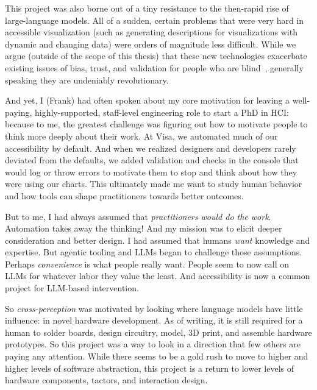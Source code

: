 \documentclass[12pt]{cmuthesis}
\begin{document}
This project was also borne out of a tiny resistance to the then-rapid rise of large-language models. All of a sudden, certain problems that were very hard in accessible visualization (such as generating descriptions for visualizations with dynamic and changing data) were orders of magnitude less difficult. While we argue (outside of the scope of this thesis) that these new technologies exacerbate existing issues of bias, trust, and validation for people who are blind~\cite{Elavsky2025}, generally speaking they are undeniably revolutionary.

And yet, I (Frank) had often spoken about my core motivation for leaving a well-paying, highly-supported, staff-level engineering role to start a PhD in HCI: because to me, the greatest challenge was figuring out how to motivate people to think more deeply about their work. At Visa, we automated much of our accessibility by default. And when we realized designers and developers rarely deviated from the defaults, we added validation and checks in the console that would log or throw errors to motivate them to stop and think about how they were using our charts. This ultimately made me want to study human behavior and how tools can shape practitioners towards better outcomes.

But to me, I had always assumed that \textit{practitioners would do the work}. Automation takes away the thinking! And my mission was to elicit deeper consideration and better design. I had assumed that humans \textit{want} knowledge and expertise. But agentic tooling and LLMs began to challenge those assumptions. Perhaps \textit{convenience} is what people really want. People seem to now call on LLMs for whatever labor they value the least. And accessibility is now a common project for LLM-based intervention.

So \textit{cross-perception} was motivated by looking where language models have little influence: in novel hardware development. As of writing, it is still required for a human to solder boards, design circuitry, model, 3D print, and assemble hardware prototypes. So this project was a way to look in a direction that few others are paying any attention. While there seems to be a gold rush to move to higher and higher levels of software abstraction, this project is a return to lower levels of hardware components, tactors, and interaction design.
\end{document}
